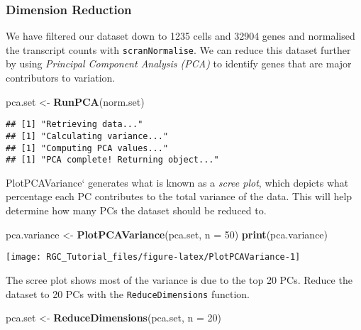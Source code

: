 \documentclass[]{article}
\newenvironment{Shaded}{\begin{snugshade}}{\end{snugshade}}
\newcommand{\DataTypeTok}[1]{\textcolor[rgb]{0.13,0.29,0.53}{#1}}
\newcommand{\DecValTok}[1]{\textcolor[rgb]{0.00,0.00,0.81}{#1}}
\newcommand{\KeywordTok}[1]{\textcolor[rgb]{0.13,0.29,0.53}{\textbf{#1}}}
\newcommand{\NormalTok}[1]{#1}
\newcommand{\StringTok}[1]{\textcolor[rgb]{0.31,0.60,0.02}{#1}}
\begin{document}
\hypertarget{dimension-reduction}{%
\subsubsection{Dimension Reduction}\label{dimension-reduction}}

We have filtered our dataset down to 1235 cells and 32904 genes and
normalised the transcript counts with \texttt{scranNormalise}. We can
reduce this dataset further by using \emph{Principal Component Analysis
(PCA)} to identify genes that are major contributors to variation.

\begin{Shaded}
\begin{Highlighting}[]
\NormalTok{pca.set <-}\StringTok{ }\KeywordTok{RunPCA}\NormalTok{(norm.set)}
\end{Highlighting}
\end{Shaded}

\begin{verbatim}
## [1] "Retrieving data..."
## [1] "Calculating variance..."
## [1] "Computing PCA values..."
## [1] "PCA complete! Returning object..."
\end{verbatim}

PlotPCAVariance` generates what is known as a \emph{scree plot}, which
depicts what percentage each PC contributes to the total variance of the
data. This will help determine how many PCs the dataset should be
reduced to.

\begin{Shaded}
\begin{Highlighting}[]
\NormalTok{pca.variance <-}\StringTok{ }\KeywordTok{PlotPCAVariance}\NormalTok{(pca.set, }\DataTypeTok{n =} \DecValTok{50}\NormalTok{)}
\KeywordTok{print}\NormalTok{(pca.variance)}
\end{Highlighting}
\end{Shaded}

\begin{center}\texttt{[image: RGC\_Tutorial\_files/figure-latex/PlotPCAVariance-1]} \end{center}

The scree plot shows most of the variance is due to the top 20 PCs.
Reduce the dataset to 20 PCs with the \texttt{ReduceDimensions}
function.

\begin{Shaded}
\begin{Highlighting}[]
\NormalTok{pca.set <-}\StringTok{ }\KeywordTok{ReduceDimensions}\NormalTok{(pca.set, }\DataTypeTok{n =} \DecValTok{20}\NormalTok{)}
\end{Highlighting}
\end{Shaded}
\end{document}
